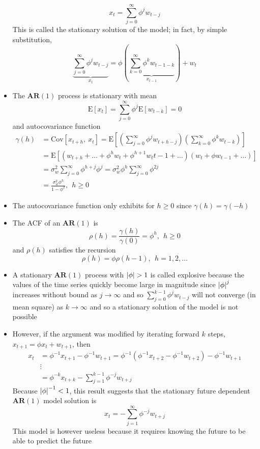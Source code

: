 \documentclass[12pt]{article}
\newcommand{\expe}[1]{\text{E}\left[ #1 \right]}
\newcommand{\cov}[2]{\text{Cov}\left[#1, ~#2\right]}
\newcommand{\ar}[1]{$\mathbf{AR}(#1)$}
\begin{document}
\begin{itemize}
$$ x_t = \sum_{j=0}^\infty \phi^jw_{t-j} $$ This is called the stationary solution of the model; in fact, by simple substitution, $$ \underbrace{\sum_{j=0}^\infty \phi^j w_{t-j}}_{x_t} = \phi\left( \underbrace{\sum_{k=0}^\infty \phi^kw_{t-1-k}}_{x_{t-1}}\right) + w_t $$
\item The \ar{1} process is stationary with mean $$ \expe{x_t} = \sum_{j=0}^\infty \phi^j \expe{w_{t-k}} = 0 $$ and autocovariance function
$$ \begin{aligned} \gamma(h) &= \cov{x_{t+h}}{x_t} = \expe{ \left( \sum_{j=0}^\infty \phi^jw_{t+h-j}\right)\left(\sum_{k=0}^\infty \phi^kw_{t-k}\right)} \\ &= \expe{(w_{t+h} + \dots + \phi^hw_t + \phi^{h+1}w_t{t-1} + \dots)(w_t + \phi w_{t-1} + \dots)} \\ &= \sigma^2_w\sum_{j=0}^\infty \phi^{h+j}\phi^j = \sigma^2_w\phi^h \sum_{j=0}^\infty \phi^{2j} \\ &= \frac{\sigma^2_w \phi^h}{1-\phi^2}, ~~ h \geq 0 \end{aligned} $$ 
\item The autocovariance function only exhibits for $h \geq 0$ since $\gamma(h) = \gamma(-h)$
\item The ACF of an \ar{1} is $$ \rho(h) = \frac{\gamma(h)}{\gamma(0)} = \phi^h, ~~ h \geq 0 $$ and $\rho(h)$ satisfies the recursion $$ \rho(h) = \phi \rho(h-1), ~~ h = 1,2,\dots $$ 
\item A stationary \ar{1} process with $\abs{\phi} > 1$ is called explosive because the values of the time series quickly become large in magnitude since $\abs{\phi}^j$ increases without bound as $j\to\infty$ and so $\sum_{j=0}^{k-1} \phi^jw_{t-j}$ will not converge (in mean square) as $k \to\infty$ and so a stationary solution of the model is not possible
\item However, if the argument was modified by iterating forward $k$ steps, $x_{t+1} = \phi x_t + w_{t+1}$, then $$ \begin{aligned} x_t &= \phi^{-1}x_{t+1} - \phi^{-1}w_{t+1} = \phi^{-1}(\phi^{-1}x_{t+2} - \phi^{-1} w_{t+2}) - \phi^{-1}w_{t+1} \\ &\vdots \\ &= \phi^{-k}x_{t+k} - \sum_{j=1}^{k-1}\phi^{-j}w_{t+j} \end{aligned} $$ 
Because $\abs{\phi}^{-1} < 1$, this result suggests that the stationary future dependent \ar{1} model solution is $$ x_t = -\sum_{j=1}^\infty \phi^{-j}w_{t+j} $$ 
This model is however useless because it requires knowing the future to be able to predict the future

\end{itemize}
\end{document}
